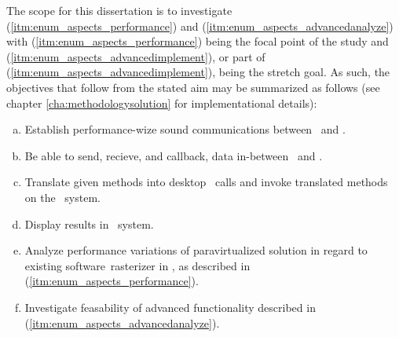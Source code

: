 The scope for this dissertation is to investigate (\ref{itm:enum_aspects_performance}) and (\ref{itm:enum_aspects_advancedanalyze}) with (\ref{itm:enum_aspects_performance}) being the focal point of the study and (\ref{itm:enum_aspects_advancedimplement}), or part of (\ref{itm:enum_aspects_advancedimplement}), being the stretch goal.
As such, the objectives that follow from the stated aim may be summarized as follows (see chapter \ref{cha:methodologysolution} for implementational details):

\newcommand*\objective[1]{\item}
\begin{multicols}{2}
\begin{enumerate}[(a)]
	\objective{1} Establish performance-wize sound communications between \dvttermhost\ and \dvttermtarget .
	\objective{2} Be able to send, recieve, and callback, data in-between \dvttermhost\ and \dvttermtarget .
	\objective{3} Translate given methods into desktop \dvttermapi\ calls and invoke translated methods on the \dvttermhost\ system.
	\objective{4} Display results in \dvttermtarget\ system.
	\objective{5} Analyze performance variations of paravirtualized solution in regard to existing software~rasterizer in \dvttermsimics , as described in (\ref{itm:enum_aspects_performance}).
	\objective{6} Investigate feasability of advanced functionality described in (\ref{itm:enum_aspects_advancedanalyze}).
\end{enumerate}
\end{multicols}